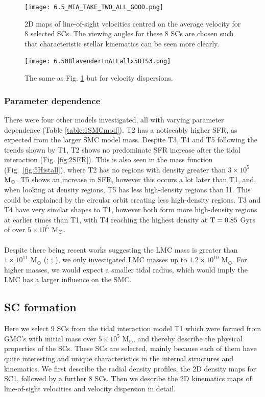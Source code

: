 \documentclass[fleqn,usenatbib]{mnras}
\begin{document}
\begin{figure}
 \texttt{[image: 6.5\_MIA\_TAKE\_TWO\_ALL\_GOOD.png]}
 \caption{2D maps of line-of-sight velocities centred on the average velocity for 8 selected SCs. The viewing angles for these 8 SCs are chosen such that characteristic stellar kinematics can be seen more clearly.}
 \label{fig:10.5velocity}
\end{figure}

\begin{figure}
 \texttt{[image: 6.508lavendertnALLallx5DIS3.png]}
 \caption{The same as Fig. \ref{fig:10.5velocity} but for velocity dispersions.}
 \label{fig:10.6dispersion}
\end{figure}

\subsubsection{Parameter dependence}

There were four other models investigated, all with varying parameter dependence (Table \ref{table:1SMCmod}). T2 has a noticeably higher SFR, as expected from the larger SMC model mass. Despite T3, T4 and T5 following the trends shown by T1, T2 shows no predominate SFR increase after the tidal interaction (Fig. \ref{fig:2SFR}). This is also seen in the mass function (Fig.~\ref{fig:5Histall}), %
 where T2 has no regions with density greater than $3\times 10^5$ ${\rm M}_{\odot}$. T5 shows an increase in SFR, however this occurs a lot later than T1, and, when looking at density regions, T5 has less high-density regions than I1. This could be explained by the circular orbit creating less high-density regions. T3 and T4 have very similar shapes to T1, however both form more high-density regions at earlier times than T1, with T4 reaching the highest density at ${\rm T}=0.85$ Gyrs of over $5\times 10^5$ ${\rm M}_{\odot}$. \\
 \\
 Despite there being recent works suggesting the LMC mass is greater than $1\times 10^{11}$ M$_\odot$ (\citealt{R3Pernarrubia_et_al2016}; \citealt{R1Erkal_et_al2019}; \citealt{R2Erkal_Belokurov2020}), we only investigated LMC masses up to $1.2\times 10^{10}$ M$_\odot$. For higher masses, we would expect a smaller tidal radius, which would imply the LMC has a larger influence on the SMC.
\\
\subsection{SC formation}
Here we select 9 SCs from the tidal interaction model T1 which were formed from GMC's with initial mass over $5\times 10^{5}$ M$_\odot$, and thereby describe the physical properties of the SCs. These SCs are selected, mainly because each of them have quite interesting and unique characteristics in the internal structures and kinematics. We first describe the radial density profiles, the 2D density maps for SC1, followed by a further 8 SCs. Then we describe the 2D kinematics maps of line-of-sight velocities and velocity dispersion in detail.
\end{document}
